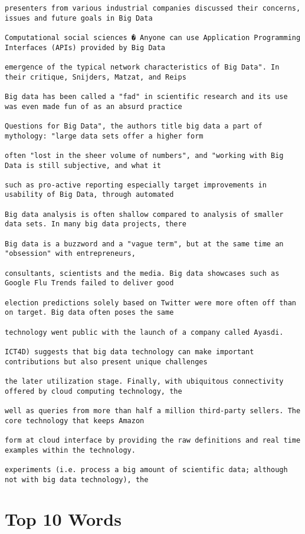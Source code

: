 \documentclass[11pt]{article}
\begin{document}
\begin{verbatim}
presenters from various industrial companies discussed their concerns, issues and future goals in Big Data

Computational social sciences � Anyone can use Application Programming Interfaces (APIs) provided by Big Data

emergence of the typical network characteristics of Big Data". In their critique, Snijders, Matzat, and Reips

Big data has been called a "fad" in scientific research and its use was even made fun of as an absurd practice

Questions for Big Data", the authors title big data a part of mythology: "large data sets offer a higher form

often "lost in the sheer volume of numbers", and "working with Big Data is still subjective, and what it

such as pro-active reporting especially target improvements in usability of Big Data, through automated

Big data analysis is often shallow compared to analysis of smaller data sets. In many big data projects, there

Big data is a buzzword and a "vague term", but at the same time an "obsession" with entrepreneurs,

consultants, scientists and the media. Big data showcases such as Google Flu Trends failed to deliver good

election predictions solely based on Twitter were more often off than on target. Big data often poses the same

technology went public with the launch of a company called Ayasdi.

ICT4D) suggests that big data technology can make important contributions but also present unique challenges

the later utilization stage. Finally, with ubiquitous connectivity offered by cloud computing technology, the

well as queries from more than half a million third-party sellers. The core technology that keeps Amazon

form at cloud interface by providing the raw definitions and real time examples within the technology.

experiments (i.e. process a big amount of scientific data; although not with big data technology), the
\end{verbatim}

\section{Top 10 Words}
\label{sec:org874d09b}
\end{document}
